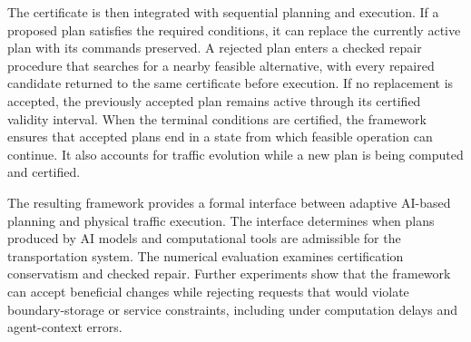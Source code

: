 \documentclass[journal,10pt]{IEEEtran}
\begin{document}
The certificate is then integrated with sequential planning and execution.
If a proposed plan satisfies the required conditions, it can replace the
currently active plan with its commands preserved. A rejected plan enters a
checked repair procedure that searches for a nearby feasible alternative,
with every repaired candidate returned to the same certificate before
execution. If no replacement is accepted, the previously accepted plan
remains active through its certified validity interval. When the terminal
conditions are certified, the framework ensures that accepted plans end in a
state from which feasible operation can continue. It also accounts for
traffic evolution while a new plan is being computed and certified.

The resulting framework provides a formal interface between adaptive
AI-based planning and physical traffic execution. The interface determines
when plans produced by AI models and computational tools are admissible for
the transportation system. The numerical evaluation examines certification
conservatism and checked repair. Further experiments show that the framework
can accept beneficial changes while rejecting requests that would violate
boundary-storage or service constraints, including under computation delays
and agent-context errors.
\end{document}
